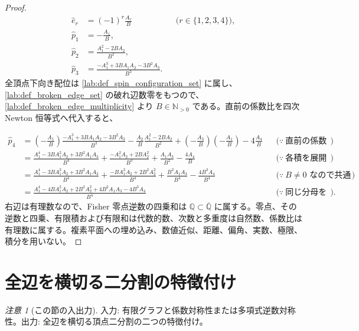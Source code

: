 \documentclass[11pt,a4paper]{article}
\theoremstyle{remark}
\newtheorem{remark}[definition]{注意}
\begin{document}
\begin{proof}
\[\begin{aligned}
\widehat e_r&=(-1)^r\frac{A_r}{B}&&\bigl(r\in\{1,2,3,4\}\bigr),\\
\widehat p_1&=-\frac{A_1}{B},\\
\widehat p_2&=\frac{A_1^2-2BA_2}{B^2},\\
\widehat p_3&=\frac{-A_1^3+3BA_1A_2-3B^2A_3}{B^3}.
\end{aligned}\]
全頂点下向き配位は
\cref{lab:def_spin_configuration_set}
 に属し、
\cref{lab:def_broken_edge_set}
 の破れ辺数零をもつので、
\cref{lab:def_broken_edge_multiplicity}
 より
$B\in\mathbb N_{>0}$
 である。直前の係数比を四次 Newton 恒等式へ代入すると、

\[\begin{aligned}
\widehat p_4
&=
\left(-\frac{A_1}{B}\right)
\frac{-A_1^3+3BA_1A_2-3B^2A_3}{B^3}
-\frac{A_2}{B}\frac{A_1^2-2BA_2}{B^2}
+\left(-\frac{A_3}{B}\right)\left(-\frac{A_1}{B}\right)
-4\frac{A_4}{B}
&&\bigl(\because\ \text{直前の係数比を代入する}\bigr)\\
&=
\frac{A_1^4-3BA_1^2A_2+3B^2A_1A_3}{B^4}
+\frac{-A_1^2A_2+2BA_2^2}{B^3}
+\frac{A_1A_3}{B^2}
-\frac{4A_4}{B}
&&\bigl(\because\ \text{各積を展開する}\bigr)\\
&=
\frac{A_1^4-3BA_1^2A_2+3B^2A_1A_3}{B^4}
+\frac{-BA_1^2A_2+2B^2A_2^2}{B^4}
+\frac{B^2A_1A_3}{B^4}
-\frac{4B^3A_4}{B^4}
&&\bigl(\because\ B\ne0\text{ なので共通分母へ移す}\bigr)\\
&=
\frac{
  A_1^4
  -4BA_1^2A_2
  +2B^2A_2^2
  +4B^2A_1A_3
  -4B^3A_4
}{B^4}
&&\bigl(\because\ \text{同じ分母をもつ項を加えて同類項をまとめる}\bigr).
\end{aligned}\]
右辺は有理数なので、Fisher 零点逆数の四乗和は
$\mathbb Q\subset\overline{\mathbb Q}$
 に属する。零点、その逆数と四乗、有限積および有限和は代数的数、次数と多重度は自然数、係数比は有理数に属する。複素平面への埋め込み、数値近似、距離、偏角、実数、極限、積分を用いない。

\end{proof}

\section{全辺を横切る二分割の特徴付け}

\begin{remark}[この節の入出力]
入力: 有限グラフと係数対称性または多項式逆数対称性。出力: 全辺を横切る頂点二分割の二つの特徴付け。

\end{remark}
\end{document}

